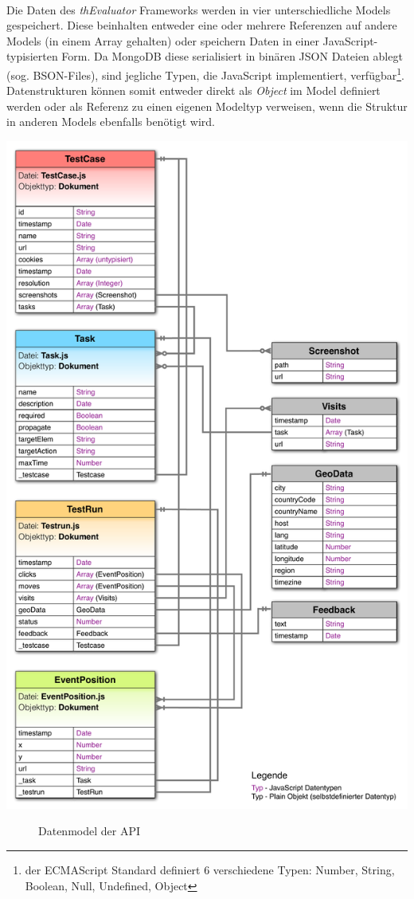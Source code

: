 \\
Die Daten des \textit{thEvaluator} Frameworks werden in vier unterschiedliche Models gespeichert. Diese beinhalten entweder eine oder mehrere Referenzen auf andere Models (in einem Array gehalten) oder speichern Daten in einer JavaScript-typisierten Form. Da MongoDB diese serialisiert in binären JSON Dateien ablegt (sog. BSON-Files), sind jegliche Typen, die JavaScript implementiert, verfügbar\footnote{der ECMAScript Standard definiert 6 verschiedene Typen: Number, String, Boolean, Null, Undefined, Object}. Datenstrukturen können somit entweder direkt als \textit{Object} im Model definiert werden oder als Referenz zu einen eigenen Modeltyp verweisen, wenn die Struktur in anderen Models ebenfalls benötigt wird.

\begin{center}
\includegraphics[scale=0.45]{./images/models}
\end{center}
\begin{figure}[htb]
   \centering
   \caption{Datenmodel der API}
    \label{models}
\end{figure}


